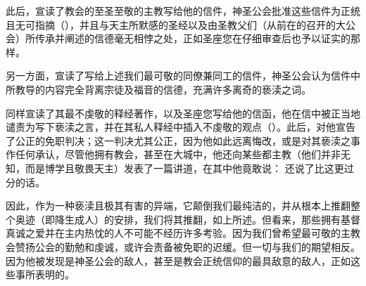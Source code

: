 此后，宣读了教会的至圣至敬的主教写给他的信件，神圣公会批准这些信件为正统且无可指摘（），并且与天主所默感的圣经以及由圣教父们（从前在的召开的大公会）所传承并阐述的信德毫无相悖之处，正如圣座您在仔细审查后也予以证实的那样。\newline{}\par

另一方面，宣读了写给上述我们最可敬的同僚兼同工的信件，神圣公会认为信件中所教导的内容完全背离宗徒及福音的信德，充满许多离奇的亵渎之词。\newline{}\par

同样宣读了其最不虔敬的释经著作，以及圣座您写给他的信函，他在信中被正当地谴责为写下亵渎之言，并在其私人释经中插入不虔敬的观点（）。此后，对他宣告了公正的免职判决；这一判决尤其公正，因为他如此远离悔改，或是对其亵渎之事作任何承认，尽管他拥有教会，甚至在大城中，他还向某些都主教（他们并非无知，而是博学且敬畏天主）发表了一篇讲道，在其中他竟敢说： 还说了比这更过分的话。\newline{}\par

因此，作为一种亵渎且极其有害的异端，它颠倒我们最纯洁的，并从根本上推翻整个奥迹（即降生成人）的安排，我们将其推翻，如上所述。但看来，那些拥有基督真诚之爱并在主内热忱的人不可能不经历许多考验。因为我们曾希望最可敬的主教会赞扬公会的勤勉和虔诚，或许会责备被免职的迟缓。但一切与我们的期望相反。因为他被发现是神圣公会的敌人，甚至是教会正统信仰的最具敌意的敌人，正如这些事所表明的。\newline{}\par


